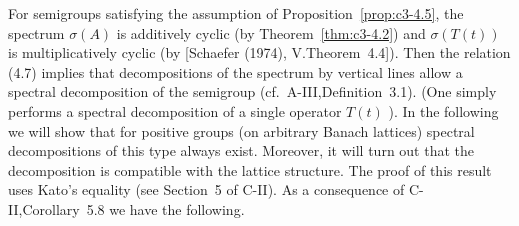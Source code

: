 %



For semigroups satisfying the assumption of Proposition~\ref{prop:c3-4.5}, the spectrum $\sigma(A)$ is additively cyclic (by Theorem~\ref{thm:c3-4.2}) and $\sigma(T(t))$ is multiplicatively cyclic
(by [Schaefer (1974), V.Theorem~4.4]). Then the relation (4.7) implies that
decompositions of the spectrum by vertical lines allow a spectral
decomposition of the semigroup (cf.\ A-III,Definition~3.1). (One simply performs a spectral decomposition of a single operator $T(t)$ ). In the
following we will show that for positive groups (on arbitrary Banach
lattices) spectral decompositions of this type always exist. Moreover,
it will turn out that the decomposition is compatible with the lattice
structure. The proof of this result uses Kato's equality (see Section~5 of
C-II). As a consequence of C-II,Corollary~5.8 we have the following.

